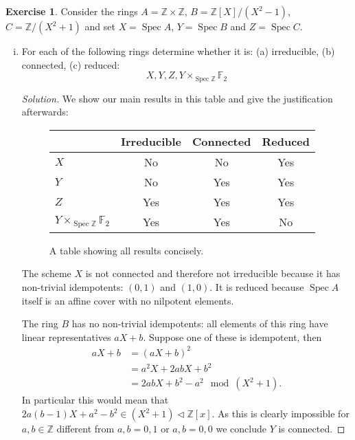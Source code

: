 \documentclass{article}
\renewcommand{\qedsymbol}{\raisebox{-0.5cm}{}}
\newcommand{\Z}{\mathbb{Z}}
\newcommand{\F}{\mathbb{F}}
\DeclareMathOperator{\spec}{Spec}
\newcommand{\ideal}{\triangleleft}
\newenvironment{solution}{\begin{proof}[Solution]\renewcommand\qedsymbol{}}{\end{proof}}
\theoremstyle{definition}
\newtheorem{question}{Exercise}
\begin{document}
\begin{question}
    Consider the rings \(A=\Z\times\Z\), \(B=\Z[X]/(X^{2}-1)\),
    \(C=\Z/(X^{2}+1)\) and set \(X=\spec A\), \(Y=\spec B\) and \(Z=\spec C\).
    \begin{enumerate}[(i)]
        \item For each of the following rings determine whether it is: (a)
              irreducible, (b) connected, (c) reduced:
              \[
                  X,Y,Z,Y\times_{\spec\Z}\F_{2}
              \]

              \begin{solution}
                  We show our main results in this table and give the
                  justification afterwards:

                  \begin{figure}[ht]
                      \centering
                      \begin{tabular}{l|c|c|c}
                                                      & Irreducible & Connected & Reduced \\\hline
                          \(X\)                       & No          & No        & Yes     \\
                          \(Y\)                       & No          & Yes       & Yes     \\
                          \(Z\)                       & Yes         & Yes       & Yes     \\
                          \(Y\times_{\spec\Z}\F_{2}\) & Yes         & Yes       & No
                      \end{tabular}
                      \caption{A table showing all results concisely.}
                  \end{figure}

                  The scheme \(X\) is not connected and therefore not
                  irreducible because it has non-trivial idempotents: \((0,1)\)
                  and \((1,0)\). It is reduced because \(\spec A\) itself is an
                  affine cover with no nilpotent elements.

                  The ring \(B\) has no non-trivial idempotents: all elements of
                  this ring have linear representatives \(aX+b\). Suppose
                  one of these is idempotent, then
                  \begin{align*}
                      aX+b & =(aX+b)^{2}                      \\
                           & =a^{2}X+2abX+b^{2}               \\
                           & =2abX+b^{2}-a^{2}\mod (X^{2}+1).
                  \end{align*}
                  In particular this would mean that
                  \(2a(b-1)X+a^{2}-b^{2}\in(X^{2}+1)\ideal\Z[x]\). As this is
                  clearly impossible for \(a,b\in\Z\) different from \(a,b=0,1\)
                  or \(a,b=0,0\) we conclude \(Y\) is connected.


\end{solution}
\end{enumerate}
\end{question}
\end{document}
